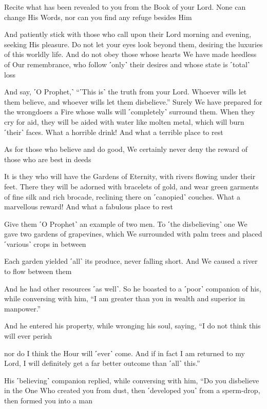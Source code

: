 Recite what has been revealed to you from the Book of your Lord. None can change His Words, nor can you find any refuge besides Him

And patiently stick with those who call upon their Lord morning and evening, seeking His pleasure. Do not let your eyes look beyond them, desiring the luxuries of this worldly life. And do not obey those whose hearts We have made heedless of Our remembrance, who follow ˹only˺ their desires and whose state is ˹total˺ loss

And say, ˹O Prophet,˺ “˹This is˺ the truth from your Lord. Whoever wills let them believe, and whoever wills let them disbelieve.” Surely We have prepared for the wrongdoers a Fire whose walls will ˹completely˺ surround them. When they cry for aid, they will be aided with water like molten metal, which will burn ˹their˺ faces. What a horrible drink! And what a terrible place to rest

As for those who believe and do good, We certainly never deny the reward of those who are best in deeds

It is they who will have the Gardens of Eternity, with rivers flowing under their feet. There they will be adorned with bracelets of gold, and wear green garments of fine silk and rich brocade, reclining there on ˹canopied˺ couches. What a marvellous reward! And what a fabulous place to rest

Give them ˹O Prophet˺ an example of two men. To ˹the disbelieving˺ one We gave two gardens of grapevines, which We surrounded with palm trees and placed ˹various˺ crops in between

Each garden yielded ˹all˺ its produce, never falling short. And We caused a river to flow between them

And he had other resources ˹as well˺. So he boasted to a ˹poor˺ companion of his, while conversing with him, “I am greater than you in wealth and superior in manpower.”

And he entered his property, while wronging his soul, saying, “I do not think this will ever perish

nor do I think the Hour will ˹ever˺ come. And if in fact I am returned to my Lord, I will definitely get a far better outcome than ˹all˺ this.”

His ˹believing˺ companion replied, while conversing with him, “Do you disbelieve in the One Who created you from dust, then ˹developed you˺ from a sperm-drop, then formed you into a man

